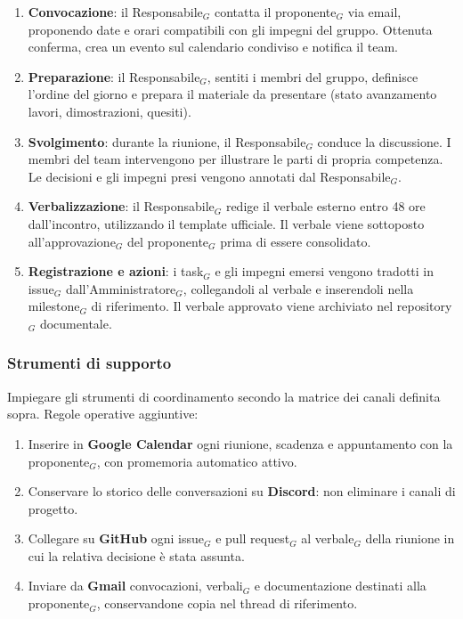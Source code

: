 \documentclass[a4paper, 10pt]{article}
\begin{document}
\begin{enumerate}
    \item \textbf{Convocazione}: il Responsabile$_G$ contatta il proponente$_G$ via email, proponendo date e orari compatibili con gli impegni del gruppo. Ottenuta conferma, crea un evento sul calendario condiviso e notifica il team.
    \item \textbf{Preparazione}: il Responsabile$_G$, sentiti i membri del gruppo, definisce l'ordine del giorno e prepara il materiale da presentare (stato avanzamento lavori, dimostrazioni, quesiti).
    \item \textbf{Svolgimento}: durante la riunione, il Responsabile$_G$ conduce la discussione. I membri del team intervengono per illustrare le parti di propria competenza. Le decisioni e gli impegni presi vengono annotati dal Responsabile$_G$.
    \item \textbf{Verbalizzazione}: il Responsabile$_G$ redige il verbale esterno entro 48 ore dall'incontro, utilizzando il template ufficiale. Il verbale viene sottoposto all'approvazione$_G$ del proponente$_G$ prima di essere consolidato.
    \item \textbf{Registrazione e azioni}: i task$_G$ e gli impegni emersi vengono tradotti in issue$_G$ dall'Amministratore$_G$, collegandoli al verbale e inserendoli nella milestone$_G$ di riferimento. Il verbale approvato viene archiviato nel repository$_G$ documentale.
\end{enumerate}

\subsubsection{Strumenti di supporto}
\label{subsubsec:strumenti_coordinamento}

Impiegare gli strumenti di coordinamento secondo la matrice dei canali definita sopra. Regole operative aggiuntive:

\begin{enumerate}
    \item Inserire in \textbf{Google Calendar} ogni riunione, scadenza e appuntamento con la proponente$_G$, con promemoria automatico attivo.
    \item Conservare lo storico delle conversazioni su \textbf{Discord}: non eliminare i canali di progetto.
    \item Collegare su \textbf{GitHub} ogni issue$_G$ e pull request$_G$ al verbale$_G$ della riunione in cui la relativa decisione è stata assunta.
    \item Inviare da \textbf{Gmail} convocazioni, verbali$_G$ e documentazione destinati alla proponente$_G$, conservandone copia nel thread di riferimento.
\end{enumerate}
\end{document}
